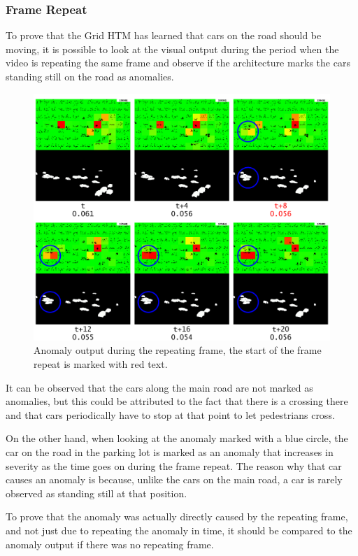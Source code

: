 \subsubsection{Frame Repeat}
To prove that the Grid HTM has learned that cars on the road should be moving, it is possible to look at the visual output during the period when the video is repeating the same frame and observe if the architecture marks the cars standing still on the road as anomalies.
\begin{figure}[H]
    \centering
    \includegraphics[width=\textwidth]{resources/experiments/surveillance/surveillance_freeze_1.png}
    \caption{Anomaly output during the repeating frame, the start of the frame repeat is marked with red text.}
\end{figure}
It can be observed that the cars along the main road are not marked as anomalies, but this could be attributed to the fact that there is a crossing there and that cars periodically have to stop at that point to let pedestrians cross.
\par
On the other hand, when looking at the anomaly marked with a blue circle, the car on the road in the parking lot is marked as an anomaly that increases in severity as the time goes on during the frame repeat. The reason why that car causes an anomaly is because, unlike the cars on the main road, a car is rarely observed as standing still at that position.
\par
To prove that the anomaly was actually directly caused by the repeating frame, and not just due to repeating the anomaly in time, it should be compared to the anomaly output if there was no repeating frame.
